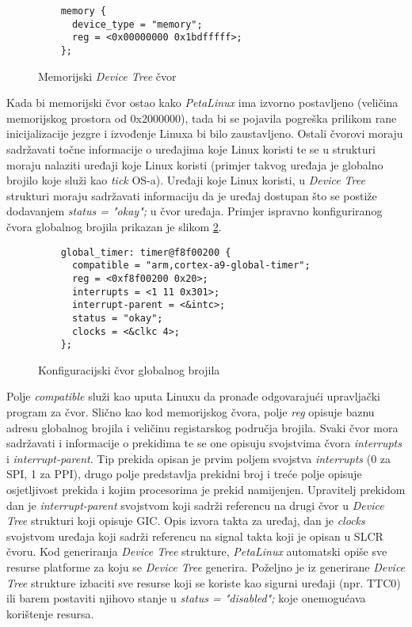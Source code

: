 \documentclass[times, utf8, diplomski, numeric]{fer}
\begin{document}
\begin{figure}[H]
  \lstset{xleftmargin=.1\textwidth}
  \begin{lstlisting}
    memory {
      device_type = "memory";
      reg = <0x00000000 0x1bdfffff>;
    };
  \end{lstlisting}
  \caption{Memorijski \textit{Device Tree} čvor}
  \label{mem_node}
\end{figure}

Kada bi memorijski čvor ostao kako \textit{PetaLinux} ima izvorno postavljeno (veličina memorijskog prostora od 0x2000000),
tada bi se pojavila pogreška prilikom rane inicijalizacije jezgre i izvođenje Linuxa bi bilo zaustavljeno.
Ostali čvorovi moraju sadržavati
točne informacije o uređajima koje Linux koristi te se u strukturi moraju nalaziti uređaji koje Linux koristi (primjer takvog
uređaja je globalno brojilo koje služi kao \textit{tick} OS-a). Uređaji koje Linux koristi, u \textit{Device Tree} strukturi moraju sadržavati informaciju da
je uređaj dostupan što se postiže dodavanjem \textit{status = "okay";} u čvor uređaja. Primjer ispravno konfiguriranog čvora
globalnog brojila prikazan je slikom \ref{glob_timer}.

\begin{figure}[H]
  \lstset{xleftmargin=.1\textwidth}
  \begin{lstlisting}
    global_timer: timer@f8f00200 {
      compatible = "arm,cortex-a9-global-timer";
      reg = <0xf8f00200 0x20>;
      interrupts = <1 11 0x301>;
      interrupt-parent = <&intc>;
      status = "okay";
      clocks = <&clkc 4>;
    };
  \end{lstlisting}
  \caption{Konfiguracijski čvor globalnog brojila}
  \label{glob_timer}
\end{figure}

Polje \textit{compatible} služi kao uputa Linuxu da pronađe odgovarajući
upravljački program za čvor. Slično kao kod memorijskog čvora, polje \textit{reg} opisuje baznu adresu globalnog brojila i
veličinu registarskog područja brojila. Svaki čvor mora sadržavati i informacije o prekidima te se one opisuju svojstvima
čvora \textit{interrupts} i \textit{interrupt-parent}. Tip prekida opisan je prvim poljem svojstva \textit{interrupts} (0 za
SPI, 1 za PPI), drugo polje predstavlja prekidni broj i treće polje opisuje osjetljivost prekida i kojim procesorima je prekid
namijenjen. Upravitelj prekidom dan je \textit{interrupt-parent} svojstvom koji sadrži referencu na drugi čvor u \textit{Device
Tree} strukturi koji opisuje GIC. Opis izvora takta za uređaj, dan je \textit{clocks} svojstvom uređaja koji sadrži referencu
na signal takta koji je opisan u SLCR čvoru.
Kod generiranja \textit{Device Tree} strukture, \textit{PetaLinux} automatski opiše sve resurse platforme za koju se
\textit{Device Tree} generira. Poželjno je iz generirane \textit{Device Tree} strukture izbaciti sve resurse koji se koriste
kao sigurni uređaji (npr. TTC0) ili barem postaviti njihovo stanje u \textit{status = "disabled";} koje onemogućava korištenje
resursa.
\end{document}
